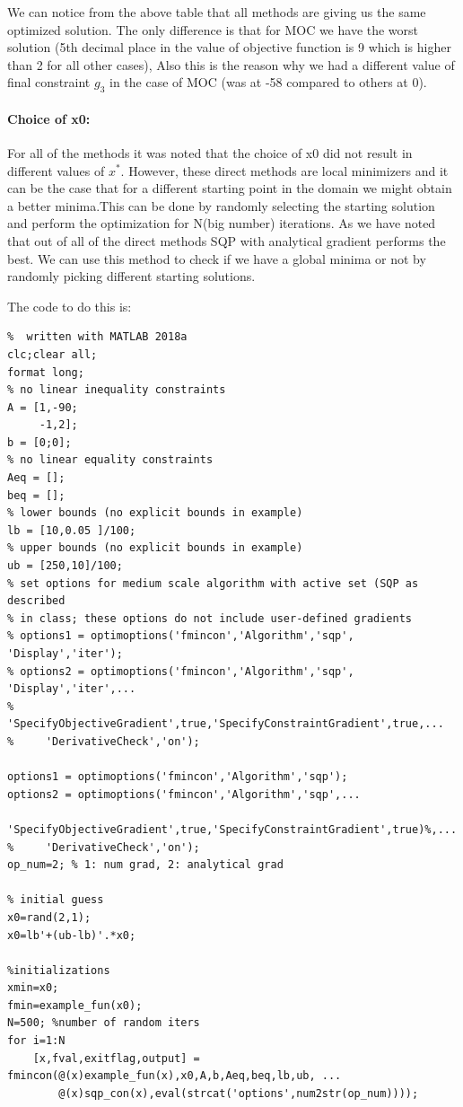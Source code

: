 \documentclass[12pt]{article}
\begin{document}
\begin{enumerate}[I]
\begin{enumerate}[1)]
We can notice from the above table that all methods are giving us the same optimized solution. The only difference is that for MOC we have the worst solution (5th decimal place in the value of objective function is 9 which is higher than 2 for all other cases), Also this is the reason why we had a different value of final constraint $g_3$ in the case of MOC (was at -58 compared to others at 0).

\paragraph{Choice of x0:} For all of the methods it was noted that the choice of x0 did not result in different values of $x^*$. However, these direct methods are local minimizers and it can be the case that for a different starting point in the domain we might obtain a better minima.This can be done by randomly selecting the starting solution and perform the optimization for N(big number) iterations.
As we have noted that out of all of the direct methods SQP with analytical gradient performs the best. We can use this method to check if we have a global minima or not by randomly picking different starting solutions.

The code to do this is:
\begin{lstlisting}
%  written with MATLAB 2018a
clc;clear all;
format long;
% no linear inequality constraints
A = [1,-90;
     -1,2];
b = [0;0];
% no linear equality constraints
Aeq = [];
beq = [];
% lower bounds (no explicit bounds in example)
lb = [10,0.05 ]/100;
% upper bounds (no explicit bounds in example)
ub = [250,10]/100;
% set options for medium scale algorithm with active set (SQP as described
% in class; these options do not include user-defined gradients
% options1 = optimoptions('fmincon','Algorithm','sqp', 'Display','iter');
% options2 = optimoptions('fmincon','Algorithm','sqp', 'Display','iter',...
%     'SpecifyObjectiveGradient',true,'SpecifyConstraintGradient',true,...
%     'DerivativeCheck','on');

options1 = optimoptions('fmincon','Algorithm','sqp');
options2 = optimoptions('fmincon','Algorithm','sqp',...
    'SpecifyObjectiveGradient',true,'SpecifyConstraintGradient',true)%,...
%     'DerivativeCheck','on');
op_num=2; % 1: num grad, 2: analytical grad

% initial guess 
x0=rand(2,1);
x0=lb'+(ub-lb)'.*x0;

%initializations
xmin=x0;
fmin=example_fun(x0);
N=500; %number of random iters
for i=1:N
    [x,fval,exitflag,output] = fmincon(@(x)example_fun(x),x0,A,b,Aeq,beq,lb,ub, ...
        @(x)sqp_con(x),eval(strcat('options',num2str(op_num))));


\end{lstlisting}
\end{enumerate}
\end{enumerate}
\end{document}
